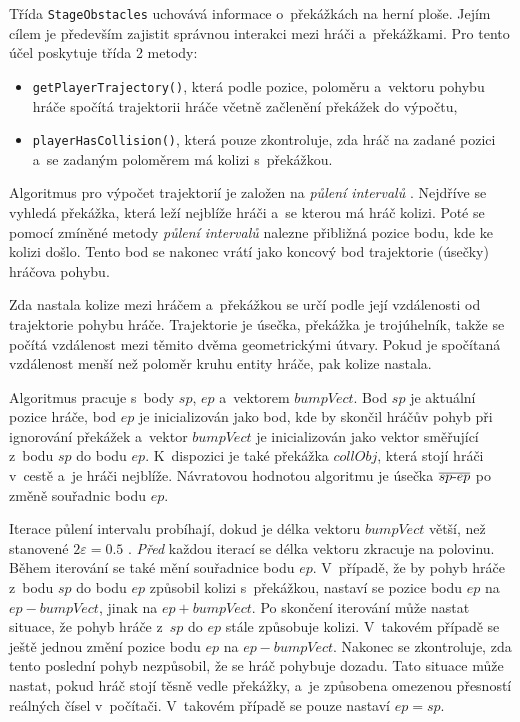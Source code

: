 Třída \texttt{StageObstacles} uchovává informace o~překážkách na herní ploše. Jejím cílem je především zajistit správnou interakci mezi hráči a~překážkami. Pro tento účel poskytuje třída 2 metody:
\begin{itemize}
    \item \texttt{getPlayerTrajectory()}, která podle pozice, poloměru a~vektoru pohybu hráče spočítá trajektorii hráče včetně začlenění překážek do výpočtu,
    \item \texttt{playerHasCollision()}, která pouze zkontroluje, zda hráč na zadané pozici a~se zadaným poloměrem má kolizi s~překážkou.
\end{itemize}


Algoritmus pro výpočet trajektorií je založen na \emph{půlení intervalů} \cite{INM_opora}. Nejdříve se vyhledá překážka, která leží nejblíže hráči a~se kterou má hráč kolizi. Poté se pomocí zmíněné metody \emph{půlení intervalů} nalezne přibližná pozice bodu, kde ke kolizi došlo. Tento bod se nakonec vrátí jako koncový bod trajektorie (úsečky) hráčova pohybu.

Zda nastala kolize mezi hráčem a~překážkou se určí podle její vzdálenosti od trajektorie pohybu hráče. Trajektorie je úsečka, překážka je trojúhelník, takže se počítá vzdálenost mezi těmito dvěma geometrickými útvary. Pokud je spočítaná vzdálenost menší než poloměr kruhu entity hráče, pak kolize nastala.

Algoritmus pracuje s~body $sp$, $ep$ a~vektorem $bumpVect$. Bod $sp$ je aktuální pozice hráče, bod $ep$ je inicializován jako bod, kde by skončil hráčův pohyb při ignorování překážek a~vektor $bumpVect$ je inicializován jako vektor směřující z~bodu $sp$ do bodu $ep$. K~dispozici je také překážka $collObj$, která stojí hráči v~cestě a~je hráči nejblíže. Návratovou hodnotou algoritmu je úsečka $\overline{sp{\text -}ep}$ po změně souřadnic bodu $ep$.

Iterace půlení intervalu probíhají, dokud je délka vektoru $bumpVect$ větší, než stanovené $2\varepsilon = 0.5$ \cite{INM_opora}. \emph{Před} každou iterací se délka vektoru zkracuje na polovinu. Během iterování se také mění souřadnice bodu $ep$. V~případě, že by pohyb hráče z~bodu $sp$ do bodu $ep$ způsobil kolizi s~překážkou, nastaví se pozice bodu $ep$ na $ep - bumpVect$, jinak na $ep + bumpVect$. Po skončení iterování může nastat situace, že pohyb hráče z~$sp$ do $ep$ stále způsobuje kolizi. V~takovém případě se ještě jednou změní pozice bodu $ep$ na $ep - bumpVect$. Nakonec se zkontroluje, zda tento poslední pohyb nezpůsobil, že se hráč pohybuje dozadu. Tato situace může nastat, pokud hráč stojí těsně vedle překážky, a~je způsobena omezenou přesností reálných čísel v~počítači. V~takovém případě se pouze nastaví $ep = sp$.

